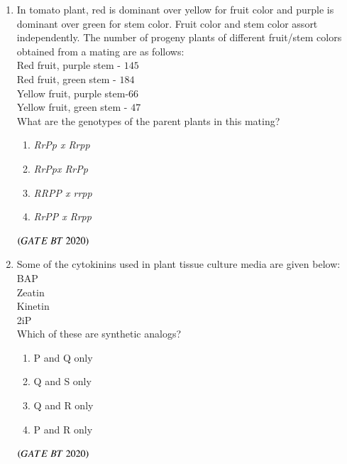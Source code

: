 \documentclass[journal,12pt,onecolumn]{IEEEtran}
\theoremstyle{remark}
\begin{document}
\begin{enumerate}[label=Q\arabic*:]
\begin{enumerate}[label=Q\arabic*:, start=26, leftmargin=2em]
\begin{multicols}{2}
\begin{enumerate}[label=\alph*)]
\item $S{\;\cdots\;}\xrightarrow{Z3} W\xrightarrow{Z1} X\xrightarrow{Z2}Y\xrightarrow{Z4}Z$\\

\item $S{\;\cdots\;}\xrightarrow{Z4} W\xrightarrow{Z1} X\xrightarrow{Z2}Y\xrightarrow{Z3}Z$

\end{enumerate} 
\end{multicols}
\hfill$\brak{GATE\ BT\ 2020}$


\item In tomato plant, red  is dominant over yellow for fruit color and purple  is dominant over green  for stem color. Fruit color and stem color assort
independently. The number of progeny plants of different fruit/stem colors obtained from a mating are as follows:\\
Red fruit, purple stem - $145$\\
Red fruit, green stem - $184$\\
Yellow fruit, purple stem-$66$\\
Yellow fruit, green stem - $47$\\

What are the genotypes of the parent plants in this mating?
\begin{multicols}{4}
\begin{enumerate}[label=\alph*)]
\item\textit{RrPp x Rrpp}
\item\textit{RrPpx RrPp}
\item\textit{RRPP x rrpp}
\item\textit{RrPP x Rrpp}
\end{enumerate}
\end{multicols}
\hfill$\brak{GATE\ BT\ 2020}$

\item Some of the cytokinins used in plant tissue culture media are given below:\\
BAP\\
Zeatin\\
Kinetin\\
2iP\\
Which of these are synthetic analogs?
\begin{multicols}{2}
\begin{enumerate}[label=\alph*)]
\item P and Q only
\item Q and S only
\item Q and R only
\item P and R only
\end{enumerate} 
\end{multicols}
\hfill$\brak{GATE\ BT\ 2020}$


\end{enumerate}
\end{enumerate}
\end{document}
